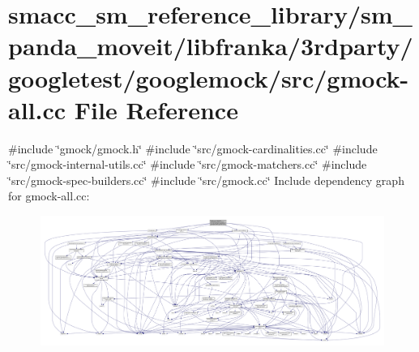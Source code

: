 \hypertarget{gmock-all_8cc}{}\section{smacc\+\_\+sm\+\_\+reference\+\_\+library/sm\+\_\+panda\+\_\+moveit/libfranka/3rdparty/googletest/googlemock/src/gmock-\/all.cc File Reference}
\label{gmock-all_8cc}
{\ttfamily \#include \char`\"{}gmock/gmock.\+h\char`\"{}}\newline
{\ttfamily \#include \char`\"{}src/gmock-\/cardinalities.\+cc\char`\"{}}\newline
{\ttfamily \#include \char`\"{}src/gmock-\/internal-\/utils.\+cc\char`\"{}}\newline
{\ttfamily \#include \char`\"{}src/gmock-\/matchers.\+cc\char`\"{}}\newline
{\ttfamily \#include \char`\"{}src/gmock-\/spec-\/builders.\+cc\char`\"{}}\newline
{\ttfamily \#include \char`\"{}src/gmock.\+cc\char`\"{}}\newline
Include dependency graph for gmock-\/all.cc\+:
\nopagebreak
\begin{figure}[H]
\begin{center}
\leavevmode
\includegraphics[width=350pt]{gmock-all_8cc__incl}
\end{center}
\end{figure}
